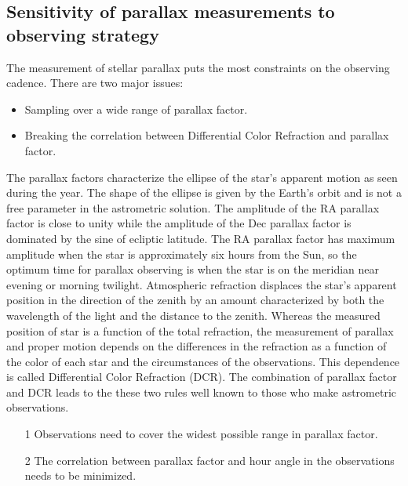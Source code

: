 \subsection{Sensitivity of parallax measurements to observing strategy}
\label{sec:keyword:MW_Astrometry_cadence}

The measurement of stellar parallax puts the most constraints on the
observing cadence.  There are two major issues:
\begin{itemize}
\item Sampling over a wide range of parallax factor.
\item Breaking the correlation between Differential Color Refraction
and parallax factor.
\end{itemize}
The parallax factors characterize the ellipse of the star's apparent motion
as seen during the year.  The shape of the ellipse is given by the Earth's
orbit and is not a free parameter in the astrometric solution.  The
amplitude of the RA parallax factor is close to unity while the amplitude
of the Dec parallax factor is dominated by the sine of ecliptic latitude.
The RA parallax factor has maximum amplitude when the star is approximately
six hours from the Sun, so the optimum time for parallax observing is when the
star is on the meridian near evening or morning twilight.
Atmospheric refraction displaces the star's apparent position in the
direction of the zenith by an amount characterized by both the wavelength
of the light and the distance to the zenith.  Whereas the measured position
of star is a function of the total refraction, the measurement of parallax
and proper motion depends on the differences in the refraction as a function
of the color of each star and the circumstances of the observations.  This
dependence is called Differential Color Refraction (DCR).
The combination of parallax factor and DCR leads to the these two rules
well known to those who make astrometric observations.
\begin{itemize}
\item [1] Observations need to cover the widest possible range in parallax
factor.
\item [2] The correlation between parallax factor and hour angle in the
observations needs to be minimized.
\end{itemize}

